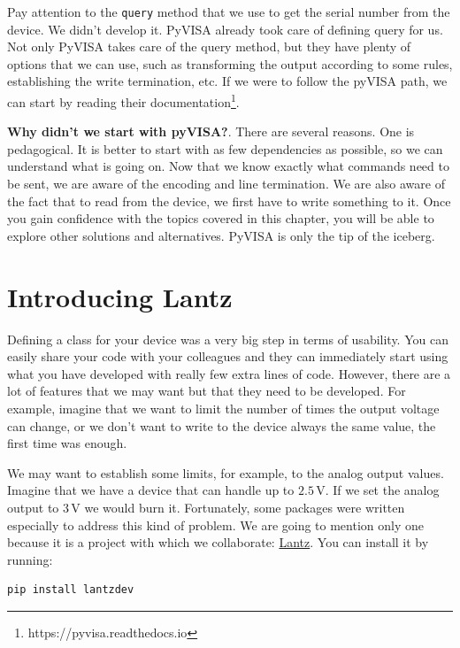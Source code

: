 Pay attention to the \texttt{query} method that we use to get the serial number from the device. We didn't develop it. PyVISA already took care of defining query for us. Not only PyVISA takes care of the query method, but they have plenty of options that we can use, such as transforming the output according to some rules, establishing the write termination, etc. If we were to follow the pyVISA path, we can start by reading their documentation\footnote{https://pyvisa.readthedocs.io}.

\textbf{Why didn't we start with pyVISA?}. There are several reasons. One is pedagogical. It is better to start with as few dependencies as possible, so we can understand what is going on. Now that we know exactly what commands need to be sent, we are aware of the encoding and line termination. We are also aware of the fact that to read from the device, we first have to write something to it. Once you gain confidence with the topics covered in this chapter, you will be able to explore other solutions and alternatives. PyVISA is only the tip of the iceberg. 

\section{Introducing Lantz}\label{section:lantz}
Defining a class for your device was a very big step in terms of usability. You can easily share your code with your colleagues and they can immediately start using what you have developed with really few extra lines of code. However, there are a lot of features that we may want but that they need to be developed. For example, imagine that we want to limit the number of times the output voltage can change, or we don't want to write to the device always the same value, the first time was enough. 

We may want to establish some limits, for example, to the analog output values. Imagine that we have a device that can handle up to $2.5\,\textrm{V}$. If we set the analog output to $3\,\textrm{V}$ we would burn it. Fortunately, some packages were written especially to address this kind of problem. We are going to mention only one because it is a project with which we collaborate: \href{https://github.com/lantzproject/lantz}{Lantz}. You can install it by running:

\begin{verbatim}
pip install lantzdev
\end{verbatim}


